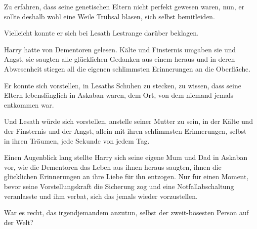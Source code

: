 Zu erfahren, dass seine genetischen Eltern nicht perfekt gewesen waren, nun, er sollte deshalb wohl eine Weile Trübsal blasen, sich selbst bemitleiden.

Vielleicht konnte er sich bei Lesath Lestrange darüber beklagen.

Harry hatte von Dementoren gelesen. Kälte und Finsternis umgaben sie und Angst, sie saugten alle glücklichen Gedanken aus einem heraus und in deren Abwesenheit stiegen all die eigenen schlimmsten Erinnerungen an die Oberfläche.

Er konnte sich vorstellen, in Lesaths Schuhen zu stecken, zu wissen, dass seine Eltern lebenslänglich in Askaban waren, dem Ort, von dem niemand jemals entkommen war.

Und Lesath würde sich vorstellen, anstelle seiner Mutter zu sein, in der Kälte und der Finsternis und der Angst, allein mit ihren schlimmsten Erinnerungen, selbst in ihren Träumen, jede Sekunde von jedem Tag.

Einen Augenblick lang stellte Harry sich seine eigene Mum und Dad in Askaban vor, wie die Dementoren das Leben aus ihnen heraus saugten, ihnen die glücklichen Erinnerungen an ihre Liebe für ihn entzogen. Nur für einen Moment, bevor seine Vorstellungskraft die Sicherung zog und eine Notfallabschaltung veranlasste und ihm verbat, sich das jemals wieder vorzustellen.

War es recht, das irgendjemandem anzutun, selbst der zweit-bösesten Person auf der Welt?

